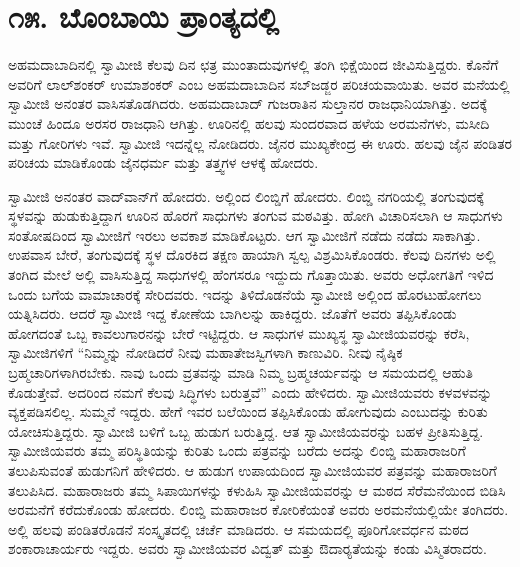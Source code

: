 
\chapter*{೧೫. ಬೊಂಬಾಯಿ ಪ್ರಾಂತ್ಯದಲ್ಲಿ}

ಅಹಮದಾಬಾದಿನಲ್ಲಿ ಸ್ವಾಮೀಜಿ ಕೆಲವು ದಿನ ಛತ್ರ ಮುಂತಾದುವುಗಳಲ್ಲಿ ತಂಗಿ ಭಿಕ್ಷೆಯಿಂದ ಜೀವಿಸುತ್ತಿದ್ದರು. ಕೊನೆಗೆ ಅವರಿಗೆ ಲಾಲ್‍ಶಂಕರ್ ಉಮಾಶಂಕರ್ ಎಂಬ ಅಹಮದಾಬಾದಿನ ಸಬ್‍ಜಡ್ಜರ ಪರಿಚಯವಾಯಿತು. ಅವರ ಮನೆಯಲ್ಲಿ ಸ್ವಾಮೀಜಿ ಅನಂತರ ವಾಸಿಸತೊಡಗಿದರು. ಅಹಮದಾಬಾದ್ ಗುಜರಾತಿನ ಸುಲ್ತಾನರ ರಾಜಧಾನಿಯಾಗಿತ್ತು. ಅದಕ್ಕೆ ಮುಂಚೆ ಹಿಂದೂ ಅರಸರ ರಾಜಧಾನಿ ಆಗಿತ್ತು. ಊರಿನಲ್ಲಿ ಹಲವು ಸುಂದರವಾದ ಹಳೆಯ ಅರಮನೆಗಳು, ಮಸೀದಿ ಮತ್ತು ಗೋರಿಗಳು ಇವೆ. ಸ್ವಾಮೀಜಿ ಇದನ್ನೆಲ್ಲ ನೋಡಿದರು. ಜೈನರ ಮುಖ್ಯಕೇಂದ್ರ ಈ ಊರು. ಹಲವು ಜೈನ ಪಂಡಿತರ ಪರಿಚಯ ಮಾಡಿಕೊಂಡು ಜೈನಧರ್ಮ ಮತ್ತು ತತ್ತ್ವಗಳ ಆಳಕ್ಕೆ ಹೋದರು.

ಸ್ವಾಮೀಜಿ ಅನಂತರ ವಾದ್‍ವಾನ್‍ಗೆ ಹೋದರು. ಅಲ್ಲಿಂದ ಲಿಂಬ್ಡಿಗೆ ಹೋದರು. ಲಿಂಬ್ಡಿ ನಗರಿಯಲ್ಲಿ ತಂಗುವುದಕ್ಕೆ ಸ್ಥಳವನ್ನು ಹುಡುಕುತ್ತಿದ್ದಾಗ ಊರಿನ ಹೊರಗೆ ಸಾಧುಗಳು ತಂಗುವ ಮಠವಿತ್ತು. ಹೋಗಿ ವಿಚಾರಿಸಲಾಗಿ ಆ ಸಾಧುಗಳು ಸಂತೋಷದಿಂದ ಸ್ವಾಮೀಜಿಗೆ ಇರಲು ಅವಕಾಶ ಮಾಡಿಕೊಟ್ಟರು. ಆಗ ಸ್ವಾಮೀಜಿಗೆ ನಡೆದು ನಡೆದು ಸಾಕಾಗಿತ್ತು. ಉಪವಾಸ ಬೇರೆ, ತಂಗುವುದಕ್ಕೆ ಸ್ಥಳ ದೊರಕಿದ ತಕ್ಷಣ ಹಾಯಾಗಿ ಸ್ವಲ್ಪ ವಿಶ್ರಮಿಸಿಕೊಂಡರು. ಕೆಲವು ದಿನಗಳು ಅಲ್ಲಿ ತಂಗಿದ ಮೇಲೆ ಅಲ್ಲಿ ವಾಸಿಸುತ್ತಿದ್ದ ಸಾಧುಗಳಲ್ಲಿ ಹೆಂಗಸರೂ ಇದ್ದುದು ಗೊತ್ತಾಯಿತು. ಅವರು ಅಧೋಗತಿಗೆ ಇಳಿದ ಒಂದು ಬಗೆಯ ವಾಮಾಚಾರಕ್ಕೆ ಸೇರಿದವರು. ಇದನ್ನು ತಿಳಿದೊಡನೆಯೆ ಸ್ವಾಮೀಜಿ ಅಲ್ಲಿಂದ ಹೊರಟುಹೋಗಲು ಯತ್ನಿಸಿದರು. ಆದರೆ ಸ್ವಾಮೀಜಿ ಇದ್ದ ಕೋಣೆಯ ಬಾಗಿಲನ್ನು ಹಾಕಿದ್ದರು. ಜೊತೆಗೆ ಅವರು ತಪ್ಪಿಸಿಕೊಂಡು ಹೋಗದಂತೆ ಒಬ್ಬ ಕಾವಲುಗಾರನನ್ನು ಬೇರೆ ಇಟ್ಟಿದ್ದರು. ಆ ಸಾಧುಗಳ ಮುಖ್ಯಸ್ಥ ಸ್ವಾಮೀಜಿಯವರನ್ನು ಕರೆಸಿ, ಸ್ವಾಮೀಜಿಗಳಿಗೆ “ನಿಮ್ಮನ್ನು ನೋಡಿದರೆ ನೀವು ಮಹಾತೇಜಸ್ವಿಗಳಾಗಿ ಕಾಣುವಿರಿ. ನೀವು ನೈಷ್ಠಿಕ ಬ್ರಹ್ಮಚಾರಿಗಳಾಗಿರಬೇಕು. ನಾವು ಒಂದು ವ್ರತವನ್ನು ಮಾಡಿ ನಿಮ್ಮ ಬ್ರಹ್ಮಚರ್ಯವನ್ನು ಆ ಸಮಯದಲ್ಲಿ ಆಹುತಿ ಕೊಡುತ್ತೇವೆ. ಅದರಿಂದ ನಮಗೆ ಕೆಲವು ಸಿದ್ಧಿಗಳು ಬರುತ್ತವೆ” ಎಂದು ಹೇಳಿದರು. ಸ್ವಾಮೀಜಿಯವರು ಕಳವಳವನ್ನು ವ್ಯಕ್ತಪಡಿಸಲಿಲ್ಲ. ಸುಮ್ಮನೆ ಇದ್ದರು. ಹೇಗೆ ಇವರ ಬಲೆಯಿಂದ ತಪ್ಪಿಸಿಕೊಂಡು ಹೋಗುವುದು ಎಂಬುದನ್ನು ಕುರಿತು ಯೋಚಿಸುತ್ತಿದ್ದರು. ಸ್ವಾಮೀಜಿ ಬಳಿಗೆ ಒಬ್ಬ ಹುಡುಗ ಬರುತ್ತಿದ್ದ. ಆತ ಸ್ವಾಮೀಜಿಯವರನ್ನು ಬಹಳ ಪ್ರೀತಿಸುತ್ತಿದ್ದ. ಸ್ವಾಮೀಜಿಯವರು ತಮ್ಮ ಪರಿಸ್ಥಿತಿಯನ್ನು ಕುರಿತು ಒಂದು ಪತ್ರವನ್ನು ಬರೆದು ಅದನ್ನು ಲಿಂಬ್ಡಿ ಮಹಾರಾಜರಿಗೆ ತಲುಪಿಸುವಂತೆ ಹುಡುಗನಿಗೆ ಹೇಳಿದರು. ಆ ಹುಡುಗ ಉಪಾಯದಿಂದ ಸ್ವಾಮೀಜಿಯವರ ಪತ್ರವನ್ನು ಮಹಾರಾಜರಿಗೆ ತಲುಪಿಸಿದ. ಮಹಾರಾಜರು ತಮ್ಮ ಸಿಪಾಯಿಗಳನ್ನು ಕಳುಹಿಸಿ ಸ್ವಾಮೀಜಿಯವರನ್ನು ಆ ಮಠದ ಸೆರೆಮನೆಯಿಂದ ಬಿಡಿಸಿ ಅರಮನೆಗೆ ಕರೆದುಕೊಂಡು ಹೋದರು. ಲಿಂಬ್ಡಿ ಮಹಾರಾಜರ ಕೋರಿಕೆಯಂತೆ ಅವರು ಅರಮನೆಯಲ್ಲಿಯೇ ತಂಗಿದರು. ಅಲ್ಲಿ ಹಲವು ಪಂಡಿತರೊಡನೆ ಸಂಸ್ಕೃತದಲ್ಲಿ ಚರ್ಚೆ ಮಾಡಿದರು. ಆ ಸಮಯದಲ್ಲಿ ಪೂರಿಗೋವರ್ಧನ ಮಠದ ಶಂಕಾರಾಚಾರ್ಯರು ಇದ್ದರು. ಅವರು ಸ್ವಾಮೀಜಿಯವರ ವಿದ್ವತ್ ಮತ್ತು ಔದಾರ‍್ಯತೆಯನ್ನು ಕಂಡು ವಿಸ್ಮಿತರಾದರು. 

